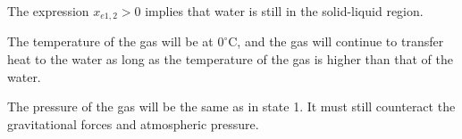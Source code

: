 The expression \( x_{e1,2} > 0 \) implies that water is still in the solid-liquid region.

The temperature of the gas will be at \(0^\circ \text{C}\), and the gas will continue to transfer heat to the water as long as the temperature of the gas is higher than that of the water.

The pressure of the gas will be the same as in state 1. It must still counteract the gravitational forces and atmospheric pressure.